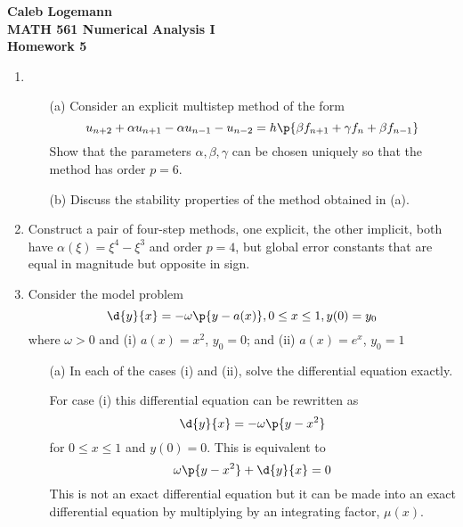 \documentclass[11pt]{article}
\begin{document}
\noindent \textbf{\Large{Caleb Logemann \\
MATH 561 Numerical Analysis I \\
Homework 5
}}

\begin{enumerate}
    \item %
        \begin{enumerate}
            \item[(a)]
                Consider an explicit multistep method of the form
                \[
                    u_{n+2} + \alpha u_{n+1} - \alpha u_{n-1} - u_{n-2} =
                    h\p{\beta f_{n+1} + \gamma f_n + \beta f_{n-1}}
                \]
                Show that the parameters $\alpha, \beta, \gamma$ can be
                chosen uniquely so that the method has order $p = 6$.


            \item[(b)]
                Discuss the stability properties of the method obtained in (a).

        \end{enumerate}

    \item %
        Construct a pair of four-step methods, one explicit, the other implicit,
        both have $\alpha(\xi) = \xi^4 - \xi^3$ and order $p = 4$,
        but global error constants that are equal in magnitude but opposite in
        sign.


    \item %
        Consider the model problem
        \[
            \d{y}{x} = -\omega\p{y - a(x)}, 0 \le x \le 1, y(0) = y_0
        \]
        where $\omega > 0$ and (i) $a(x) = x^2$, $y_0 = 0$; and (ii) $a(x) = e^x$, $y_0 = 1$
        \begin{enumerate}
            \item[(a)]
                In each of the cases (i) and (ii), solve the differential
                equation exactly.

                For case (i) this differential equation can be rewritten as
                \[
                    \d{y}{x} = -\omega\p{y - x^2}
                \]
                for $0 \le x \le 1$ and $y(0) = 0$.
                This is equivalent to 
                \[
                    \omega\p{y - x^2} + \d{y}{x} = 0
                \]
                This is not an exact differential equation but it can be made
                into an exact differential equation by multiplying by an
                integrating factor, $\mu(x)$.


\end{enumerate}
\end{enumerate}
\end{document}
